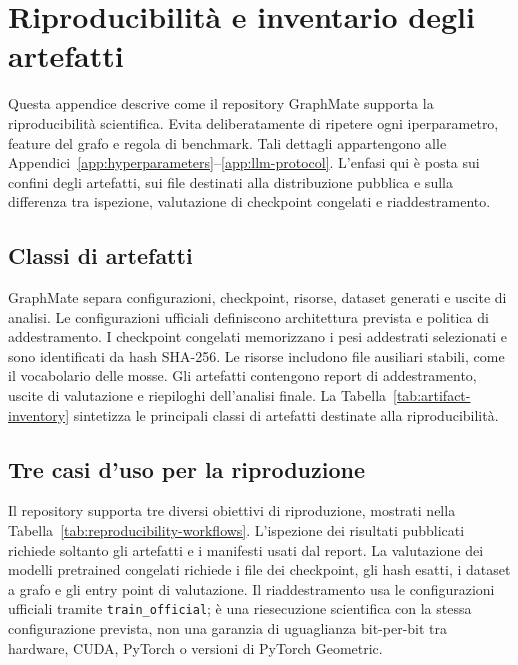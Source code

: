 \chapter{Riproducibilità e inventario degli artefatti}
\label{app:reproducibility}

Questa appendice descrive come il repository GraphMate supporta la riproducibilità scientifica.  Evita deliberatamente di ripetere ogni iperparametro, feature del grafo e regola di benchmark.  Tali dettagli appartengono alle Appendici~\ref{app:hyperparameters}--\ref{app:llm-protocol}.  L'enfasi qui è posta sui confini degli artefatti, sui file destinati alla distribuzione pubblica e sulla differenza tra ispezione, valutazione di checkpoint congelati e riaddestramento.

\section{Classi di artefatti}
\label{app:reproducibility:artifacts}

GraphMate separa configurazioni, checkpoint, risorse, dataset generati e uscite di analisi.  Le configurazioni ufficiali definiscono architettura prevista e politica di addestramento.  I checkpoint congelati memorizzano i pesi addestrati selezionati e sono identificati da hash SHA-256.  Le risorse includono file ausiliari stabili, come il vocabolario delle mosse.  Gli artefatti contengono report di addestramento, uscite di valutazione e riepiloghi dell'analisi finale.  La Tabella~\ref{tab:artifact-inventory} sintetizza le principali classi di artefatti destinate alla riproducibilità.



\section{Tre casi d'uso per la riproduzione}
\label{app:reproducibility:workflows}

Il repository supporta tre diversi obiettivi di riproduzione, mostrati nella Tabella~\ref{tab:reproducibility-workflows}.  L'ispezione dei risultati pubblicati richiede soltanto gli artefatti e i manifesti usati dal report.  La valutazione dei modelli pretrained congelati richiede i file dei checkpoint, gli hash esatti, i dataset a grafo e gli entry point di valutazione.  Il riaddestramento usa le configurazioni ufficiali tramite \texttt{train\_official}; è una riesecuzione scientifica con la stessa configurazione prevista, non una garanzia di uguaglianza bit-per-bit tra hardware, CUDA, PyTorch o versioni di PyTorch Geometric.

